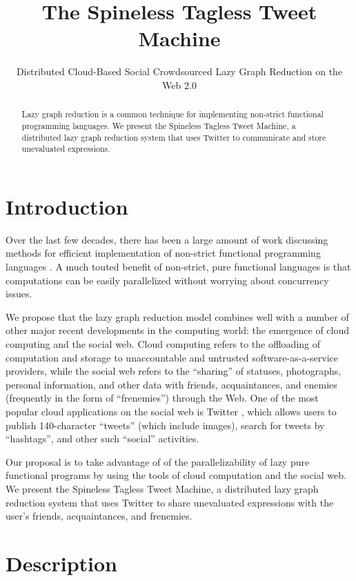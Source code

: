 \documentclass[preprint]{sigplanconf}
\title{The Spineless Tagless Tweet Machine}
\subtitle{Distributed Cloud-Based Social Crowdsourced Lazy Graph Reduction on the Web 2.0}
\begin{document}
\maketitle

\begin{abstract}
Lazy graph reduction is a common technique for implementing non-strict
functional programming languages.
We present the Spineless Tagless Tweet Machine, a distributed lazy
graph reduction system that uses Twitter to communicate and store
unevaluated expressions.
\end{abstract}

\section{Introduction}
Over the last few decades, there has been a large amount of work
discussing methods for efficient implementation of non-strict
functional programming languages \cite{Jones92implementinglazy}
\cite{Naylor:2010:RR:1932681.1863556}. 
A much touted benefit of non-strict, pure functional languages is that
computations can be easily parallelized without worrying about
concurrency issues.

We propose that the lazy graph reduction model combines well with a
number of other major recent developments in the computing world: the
emergence of cloud computing and the social web. Cloud computing
refers to the offloading of computation and storage to unaccountable
and untrusted software-as-a-service providers, while the social web
refers to the ``sharing'' of statuses, photographs, personal
information, and other data with friends, acquaintances, and enemies
(frequently in the form of ``frenemies'') through the Web.  One of the
most popular cloud applications on the social web is Twitter
\cite{twitter}, which allows users to publish 140-character ``tweets''
(which include images), search for tweets by ``hashtags'', and other
such ``social'' activities.

Our proposal is to take advantage of of the parallelizability of lazy
pure functional programs by using the tools of cloud computation and
the social web.  We present the Spineless Tagless Tweet Machine, a
distributed lazy graph reduction system that uses Twitter to share
unevaluated expressions with the user's friends, acquaintances, and
frenemies.

\section{Description}
\end{document}
